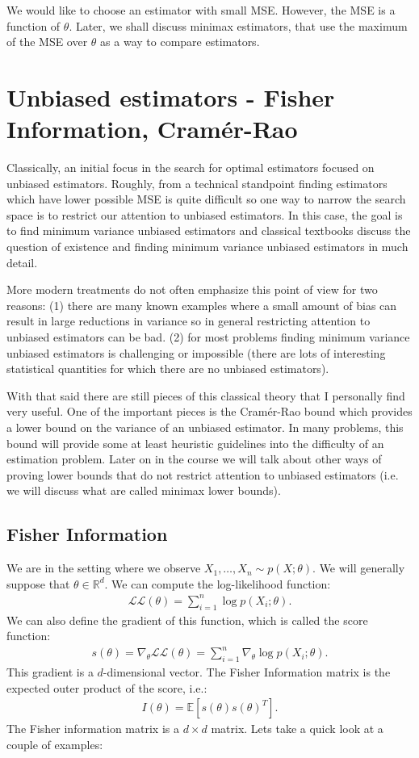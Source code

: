 \documentclass[twoside,12pt]{article}
\begin{document}
We would like to choose an estimator with small MSE.
However, the MSE is a function of $\theta$.
Later, we shall discuss minimax estimators,
that use the maximum of the MSE over $\theta$
as a way to compare estimators.

\section{Unbiased estimators - Fisher Information, Cram\'{e}r-Rao}
Classically, an initial focus in the search for optimal estimators focused on unbiased estimators. Roughly, from a technical standpoint finding estimators which have lower possible MSE is quite difficult so one way to narrow the search space is to restrict our attention to unbiased estimators. In this case, the goal is to find minimum variance unbiased estimators and classical textbooks discuss the question of existence and finding minimum variance unbiased estimators in much detail.

More modern treatments do not often emphasize this point of view for two reasons: (1) there are many known examples where a small amount of bias can result in large reductions in variance so in general restricting attention to unbiased estimators can be bad. (2) for most problems finding minimum variance unbiased estimators is challenging or impossible (there are lots of interesting statistical quantities for which there are no unbiased estimators).

With that said there are still pieces of this classical theory that I personally find very useful. One of the important pieces is the Cram\'{e}r-Rao bound which provides a lower bound on the variance of an unbiased estimator. In many problems, this bound will provide some at least heuristic guidelines into the difficulty of an estimation problem. Later on in the course we will talk about other ways of proving lower bounds that do not restrict attention to unbiased estimators (i.e. we will discuss what are called minimax lower bounds). 

\subsection{Fisher Information}
We are in the setting where we observe $X_1,\ldots,X_n \sim p(X; \theta)$. We will generally suppose that $\theta \in \mathbb{R}^d$. We can compute the log-likelihood function:
\begin{align*}
\mathcal{LL}(\theta) = \sum_{i=1}^n \log p(X_i; \theta).
\end{align*}
We can also define the gradient of this function, which is called the score function: 
\begin{align*}
s(\theta) = \nabla_{\theta} \mathcal{LL}(\theta) =  \sum_{i=1}^n \nabla_{\theta}  \log p(X_i; \theta).
\end{align*}
This gradient is a $d$-dimensional vector. 
The Fisher Information matrix is the expected outer product of the score, i.e.:
\begin{align*}
I(\theta) = \mathbb{E} [ s(\theta) s(\theta)^T].
\end{align*}
The Fisher information matrix is a $d \times d$ matrix. Lets take a quick look at a couple of examples:
\end{document}
